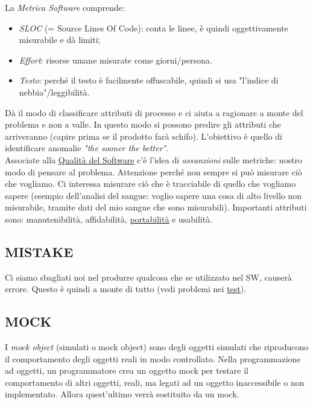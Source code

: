 		La \textit{Metrica Software} comprende:
			\begin{itemize}
				\item \textit{SLOC} (= Source Lines Of Code): conta le linee, è quindi oggettivamente misurabile e dà limiti;
				\item \textit{Effort}: risorse umane misurate come giorni/persona.
				\item \textit{Testo}: perché il testo è facilmente offuscabile, quindi si usa "l'indice di nebbia"/leggibilità. 
			\end{itemize}
		Dà il modo di classificare attributi di processo e ci aiuta a ragionare a monte del problema e non a valle. In questo modo si possono predire gli attributi che arriveranno (capire prima se il prodotto farà schifo). L'obiettivo è quello di identificare anomalie \textit{"the sooner the better"}. \\
		Associate alla \underline{\hyperref[qualita]{Qualità del Software}} c'è l'idea di \textit{assunzioni} sulle metriche: nostro modo di pensare al problema. Attenzione perché non sempre si può misurare ciò che vogliamo. Ci interessa misurare ciò che è tracciabile di quello che vogliamo sapere (esempio dell'analisi del sangue: voglio sapere una cosa di alto livello non misurabile, tramite dati del mio sangue che sono misurabili). Importanti attributi sono: manutenibilità, affidabilità, \underline{\hyperref[portabilita]{portabilità}} e usabilità.
		
		\subsection{MISTAKE}		\label{mistake}
		Ci siamo sbagliati noi nel produrre qualcosa che se utilizzato  nel SW, causerà errore. Questo è quindi a monte di tutto (vedi problemi nei \underline{\hyperref[test]{test}}).		 
		
		\subsection{MOCK}		\label{mock}
		I \textit{mock object} (simulati o mock object) sono degli oggetti simulati che riproducono il comportamento degli oggetti reali in modo controllato. Nella programmazione ad oggetti, un programmatore crea un oggetto mock per testare il comportamento di altri oggetti, reali, ma legati ad un oggetto inaccessibile o non implementato. Allora quest'ultimo verrà sostituito da un mock.
		
